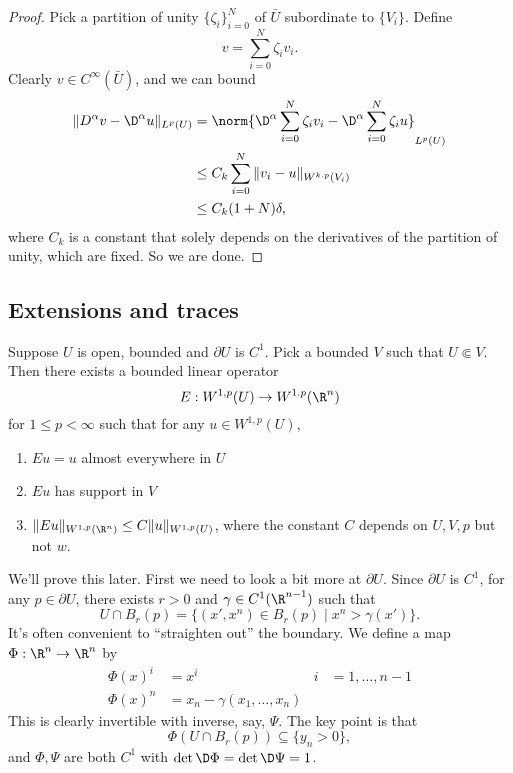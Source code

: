 \documentclass[a4paper]{article}
\begin{document}
\begin{proof}
%
  Pick a partition of unity $\{\zeta_i\}_{i = 0}^N$ of $\bar{U}$ subordinate to $\{V_i\}$. Define
  \[
    v = \sum_{i = 0}^N \zeta_i v_i.
  \]
  Clearly $v \in C^\infty(\bar{U})$, and we can bound
  \begin{align*}
    \|D^\alpha v - \D^\alpha u\|_{L^p(U)} &= \norm{\D^\alpha \sum_{i = 0}^N \zeta_i v_i - \D^\alpha \sum_{i = 0}^N \zeta_i u}_{L^p(U)}\\
    &\leq C_k \sum_{i = 0}^N \|v_i - u\|_{W^{k. p}(V_i)}\\
    &\leq C_k(1 + N)\delta,
  \end{align*}
  where $C_k$ is a constant that solely depends on the derivatives of the partition of unity, which are fixed. So we are done.
\end{proof}

\subsection{Extensions and traces}
\begin{thm}
  Suppose $U$ is open, bounded and $\partial U$ is $C^1$. Pick a bounded $V$ such that $U \Subset V$. Then there exists a bounded linear operator
  \[
    E: W^{1, p}(U) \to W^{1. p}(\R^n)
  \]
  for $1 \leq p < \infty$ such that for any $u \in W^{1, p}(U)$,
  \begin{enumerate}
    \item $Eu = u$ almost everywhere in $U$
    \item $Eu$ has support in $V$
    \item $\|Eu\|_{W^{1, p}(\R^n)} \leq C \|u\|_{W^{1, p}(U)}$, where the constant $C$ depends on $U, V, p$ but not $w$.
  \end{enumerate}
\end{thm}
We'll prove this later. First we need to look a bit more at $\partial U$. Since $\partial U$ is $C^1$, for any $p \in \partial U$, there exists $r > 0$ and $\gamma \in C^1(\R^{n - 1})$ such that
\[
  U \cap B_r(p) = \{(x', x^n) \in B_r(p) \mid x^n > \gamma(x')\}.
\]
It's often convenient to ``straighten out'' the boundary. We define a map $\Phi: \R^n \to \R^n$ by
\begin{align*}
  \Phi(x)^i &= x^i & i &= 1, \ldots, n -1\\
  \Phi(x)^n &= x_n - \gamma(x_1, \ldots, x_n)
\end{align*}
This is clearly invertible with inverse, say, $\Psi$. The key point is that
\[
  \Phi(U \cap B_r(p)) \subseteq \{y_n > 0\},
\]
and $\Phi, \Psi$ are both $C^1$ with $\det \D \Phi = \det \D \Psi = 1$.
\end{document}
